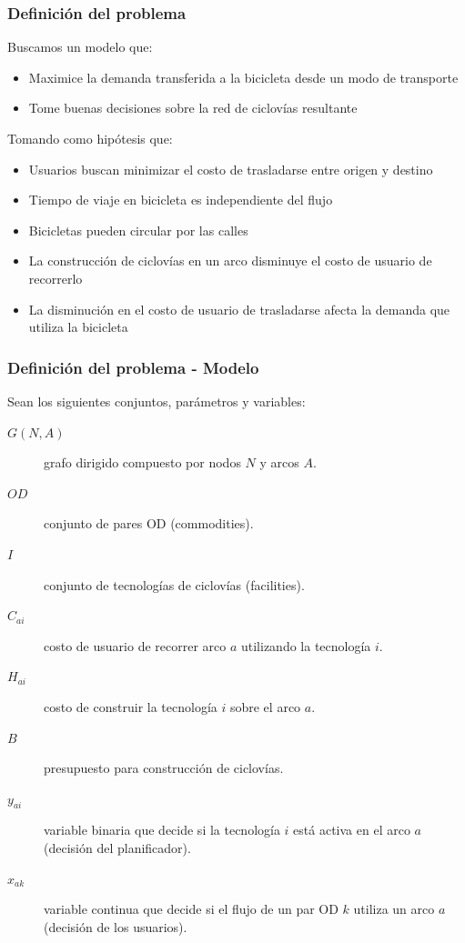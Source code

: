 \documentclass[aspectratio=43, 10pt]{beamer}
\begin{document}
\begin{frame}
    \frametitle{Definición del problema}

    Buscamos un modelo que:

    \begin{itemize}
        \item{Maximice la demanda transferida a la bicicleta desde un modo de transporte}
        \item{Tome buenas decisiones sobre la red de ciclovías resultante}
    \end{itemize}

    Tomando como hipótesis que:

    \begin{itemize}
        \item{Usuarios buscan minimizar el costo de trasladarse entre origen y destino}
        \item{Tiempo de viaje en bicicleta es independiente del flujo}
        \item{Bicicletas pueden circular por las calles}
        \item{La construcción de ciclovías en un arco disminuye el costo de usuario de recorrerlo}
        \item{La disminución en el costo de usuario de trasladarse afecta la demanda que utiliza la bicicleta}
    \end{itemize}
\end{frame}

\begin{frame}
    \frametitle{Definición del problema - Modelo}

    Sean los siguientes conjuntos, parámetros y variables:

    \begin{description}
        \item[$G(N,A)$] grafo dirigido compuesto por nodos $N$ y arcos $A$.
        \item[$OD$] conjunto de pares OD (commodities).
        \item[$I$] conjunto de tecnologías de ciclovías (facilities).
        \item[$C_{ai}$] costo de usuario de recorrer arco $a$ utilizando la tecnología $i$.
        \item[$H_{ai}$] costo de construir la tecnología $i$ sobre el arco $a$.
        \item[$B$] presupuesto para construcción de ciclovías.
        \item[$y_{ai}$] variable binaria que decide si la tecnología $i$ está activa en el arco $a$ (decisión del planificador).
        \item[$x_{ak}$] variable continua que decide si el flujo de un par OD $k$ utiliza un arco $a$ (decisión de los usuarios).
    \end{description}
\end{frame}
\end{document}
